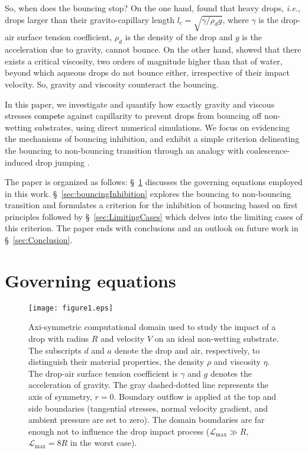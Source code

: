 \documentclass{jfm}
\newcommand{\revRev}[1]{\textcolor{black}{#1}}
\begin{document}
So, when does the bouncing stop?
On the one hand, \citet{biance2006} found that heavy drops, \emph{i.e.}, drops larger than their gravito-capillary length $l_c = \sqrt{\gamma/\rho_dg}$, where $\gamma$ is the drop-air surface tension coefficient, $\rho_d$ is the density of the drop and $g$ is the acceleration due to gravity, cannot bounce.
On the other hand, \citet{jha2020viscous} showed that there exists a critical viscosity, two orders of magnitude higher than that of water, beyond which aqueous drops do not bounce either, irrespective of their impact velocity. So, gravity and viscosity counteract the bouncing.

In this paper, we investigate and quantify how exactly gravity and viscous stresses \revRev{compete} %
against capillarity to prevent drops from bouncing off non-wetting substrates, using direct numerical simulations. 
We focus on evidencing the mechanisms of bouncing inhibition, and exhibit a simple criterion delineating the bouncing to non-bouncing transition through an analogy with coalescence-induced drop jumping \citep{boreyko2009, liu2014numerical, farokhirad2015coalescence,  mouterde2017merging, lecointre2019ballistics}.

The paper is organized as follows: \S~\ref{sec:method} discusses the governing equations employed in this work. \S~\ref{sec:bouncingInhibition} explores the bouncing to non-bouncing transition and formulates a criterion for the inhibition of bouncing based on first principles followed by \S~\ref{sec:LimitingCases} which delves into the limiting cases of this criterion. The paper ends with conclusions and an outlook on future work in \S~\ref{sec:Conclusion}. 

\section{Governing equations}
\label{sec:method}
\begin{figure}
	\centering
	\texttt{[image: figure1.eps]}
	\caption{Axi-symmetric computational domain used to study the impact of a drop with radius $R$ and velocity $V$ on an ideal non-wetting substrate. The subscripts $d$ and $a$ denote the drop and air, respectively, to distinguish their material properties, the density $\rho$ and viscosity $\eta$. The drop-air surface tension coefficient is $\gamma$ and $g$ denotes the acceleration of gravity. The gray dashed-dotted line represents the axis of symmetry, $r = 0$. Boundary outflow is applied at the top and side boundaries (tangential stresses, normal velocity gradient, and ambient pressure are set to zero). The domain boundaries are far enough not to influence the drop impact process ($\mathcal{L}_{\text{max}} \gg R$, $\mathcal{L}_{\text{max}} = 8R$ in the worst case).}
	\label{fig:schematic}
\end{figure}
\end{document}
